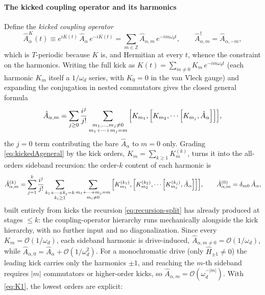 \documentclass[a4paper,11pt]{article}
\begin{document}
\paragraph{The kicked coupling operator and its harmonics}
Define the \emph{kicked coupling operator}
\begin{equation}\label{eq:kickedA}
  \hat A^K_\alpha(t) \equiv e^{iK(t)}\,\hat A_\alpha\,e^{-iK(t)}
  = \sum_{m\in\mathbb Z} \hat A_{\alpha,m}\,e^{-im\omega_d t},
  \qquad
  \hat A_{\alpha,m}^\dagger = \hat A_{\alpha,-m},
\end{equation}
which is $T$-periodic because $K$ is, and Hermitian at every $t$, whence the constraint on the harmonics. Writing the full kick as $K(t) = \sum_{m\neq0} K_m\, e^{-im\omega_d t}$ (each harmonic $K_m$ itself a $1/\omega_d$ series, with $K_0 = 0$ in the van Vleck gauge) and expanding the conjugation in nested commutators gives the closed general formula
\begin{equation}\label{eq:kickedAgeneral}
  \hat A_{\alpha,m}
  = \sum_{j\ge0}\frac{i^j}{j!}
  \sum_{\substack{m_1,\dots,m_j\neq0\\ m_1+\cdots+m_j = m}}
  \comm{K_{m_1}}{\comm{K_{m_2}}{\cdots\comm{K_{m_j}}{\hat A_\alpha}}},
\end{equation}
the $j=0$ term contributing the bare $\hat A_\alpha$ to $m=0$ only. Grading \cref{eq:kickedAgeneral} by the kick orders, $K_m = \sum_{k\ge1}K^{(k)}_m$, turns it into the all-orders sideband recursion: the order-$k$ content of each harmonic is
\begin{equation}\label{eq:kickedAgraded}
  \hat A^{(k)}_{\alpha,m}
  = \sum_{j=1}^{k}\frac{i^j}{j!}
  \sum_{\substack{k_1+\cdots+k_j = k\\ k_i\ge1}}
  \sum_{\substack{m_1+\cdots+m_j = m\\ m_i\neq0}}
  \comm{K^{(k_1)}_{m_1}}{\comm{K^{(k_2)}_{m_2}}{\cdots\comm{K^{(k_j)}_{m_j}}{\hat A_\alpha}}},
  \qquad
  \hat A^{(0)}_{\alpha,m} = \delta_{m0}\,\hat A_\alpha ,
\end{equation}
built entirely from kicks the recursion \eqref{eq:recursion-split} has already produced at stages $\le k$: the coupling-operator hierarchy runs mechanically alongside the kick hierarchy, with no further input and no diagonalization. Since every $K_m = \mathcal O(1/\omega_d)$, each sideband harmonic is drive-induced, $\hat A_{\alpha,m\neq0} = \mathcal O(1/\omega_d)$, while $\hat A_{\alpha,0} = \hat A_\alpha + \mathcal O(1/\omega_d^2)$. For a monochromatic drive (only $\hat H_{\pm1}\neq0$) the leading kick carries only the harmonics $\pm1$, and reaching the $m$-th sideband requires $|m|$ commutators or higher-order kicks, so $\hat A_{\alpha,m} = \mathcal O(\omega_d^{-|m|})$. With \cref{eq:K1}, the lowest orders are explicit:
\end{document}
